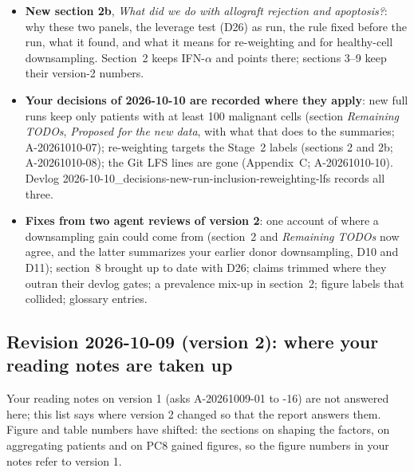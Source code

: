 \documentclass[11pt]{article}
\begin{document}
\begin{itemize}[leftmargin=1.4em]
\item \textbf{New section 2b}, \emph{What did we do with allograft rejection and apoptosis?}: why these two panels, the leverage test (D26) as run, the rule fixed before the run, what it found, and what it means for re-weighting and for healthy-cell downsampling. Section~2 keeps IFN-$\alpha$ and points there; sections 3--9 keep their version-2 numbers.
\item \textbf{Your decisions of 2026-10-10 are recorded where they apply}: new full runs keep only patients with at least 100 malignant cells (section \emph{Remaining TODOs}, \emph{Proposed for the new data}, with what that does to the summaries; A-20261010-07); re-weighting targets the Stage~2 labels (sections 2 and 2b; A-20261010-08); the Git LFS lines are gone (Appendix~C; A-20261010-10). Devlog 2026-10-10\_decisions-new-run-inclusion-reweighting-lfs records all three.
\item \textbf{Fixes from two agent reviews of version 2}: one account of where a downsampling gain could come from (section~2 and \emph{Remaining TODOs} now agree, and the latter summarizes your earlier donor downsampling, D10 and D11); section~8 brought up to date with D26; claims trimmed where they outran their devlog gates; a prevalence mix-up in section~2; figure labels that collided; glossary entries.
\end{itemize}

\subsection*{Revision 2026-10-09 (version 2): where your reading notes are taken up}

Your reading notes on version 1 (asks A-20261009-01 to -16) are not answered here; this list says where version 2 changed so that the report answers them. Figure and table numbers have shifted: the sections on shaping the factors, on aggregating patients and on PC8 gained figures, so the figure numbers in your notes refer to version 1.
\end{document}
